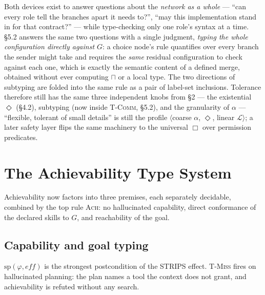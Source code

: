 \documentclass[11pt]{article}
\theoremstyle{plain}
\theoremstyle{definition}
\newcommand{\pre}{\mathit{pre}}
\newcommand{\eff}{\mathit{eff}}
\newcommand{\seither}{\mathrm{sp}}
\newcommand{\dom}{\mathrm{dom}}
\begin{document}
Both devices exist to answer questions about the \emph{network as a whole} ---
``can every role tell the branches apart it needs to?'', ``may this
implementation stand in for that contract?'' --- while type-checking only one
role's syntax at a time. \S5.2 answers the same two questions with a single
judgment, \emph{typing the whole configuration directly against $G$}: a choice
node's rule quantifies over every branch the sender might take and requires the
\emph{same} residual configuration to check against each one, which is exactly
the semantic content of a defined merge, obtained without ever computing $\sqcap$
or a local type. The two directions of subtyping are folded into the same rule as
a pair of label-set inclusions. Tolerance therefore still has the same three
independent knobs from \S2 --- the existential $\Diamond$ (\S4.2), subtyping
(now inside \textsc{T-Comm}, \S5.2), and the granularity of $\alpha$ --- ``flexible,
tolerant of small details'' is still the profile $\langle$coarse $\alpha$,
$\Diamond$, linear $\mathcal L\rangle$; a later safety layer flips the same
machinery to the universal $\Box$ over permission predicates.

\section{The Achievability Type System}

Achievability now factors into three premises, each separately decidable,
combined by the top rule \textsc{Ach}: no hallucinated capability, direct
conformance of the declared skills to $G$, and reachability of the goal.

\subsection{Capability and goal typing}
$\seither(\varphi,\eff)$ is the strongest postcondition of the STRIPS effect.
\textsc{T-Miss} fires on hallucinated planning: the plan names a tool the context
does not grant, and achievability is refuted without any search.
\end{document}
